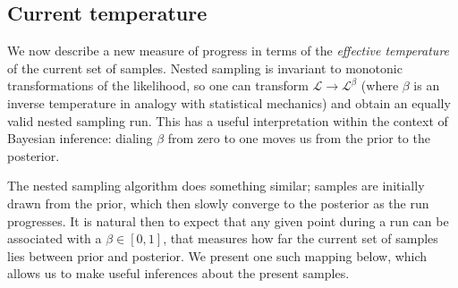 \documentclass[usenatbib]{mnras}
\begin{document}
\subsection{Current temperature}\label{sec:current_temperature}
We now describe a new measure of progress in terms of the \textit{effective temperature} of the current set of samples. Nested sampling is invariant to monotonic transformations of the likelihood, so one can transform $\mathcal{L} \rightarrow \mathcal{L}^{\beta}$ (where $\beta$ is an inverse temperature in analogy with statistical mechanics) and obtain an equally valid nested sampling run. This has a useful interpretation within the context of Bayesian inference: dialing $\beta$ from zero to one moves us from the prior to the posterior.
\par
The nested sampling algorithm does something similar; samples are initially drawn from the prior, which then slowly converge to the posterior as the run progresses. It is natural then to expect that any given point during a run can be associated with a $\beta \in [0,1]$, that measures how far the current set of samples lies between prior and posterior. We present one such mapping below, which allows us to make useful inferences about the present samples.
\end{document}
